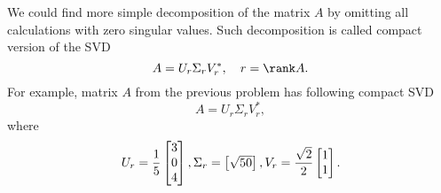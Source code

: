 \begin{note}
    We could find more simple decomposition of the matrix $A$ by omitting all calculations with zero singular values. Such decomposition is called compact version of the SVD
    $$
        A=U_{r}\Sigma_{r} V_{r}^*,\quad r=\rank A.
    $$
    For example, matrix $A$ from the previous problem has following compact SVD
    $$
        A=U_{r}\Sigma_{r} V_{r}^*,
    $$
    where
    \[
        U_{r} = \dfrac{1}{5}\begin{bmatrix}
            3 \\
            0 \\
            4  
        \end{bmatrix}
            , \vspace*{0.5cm} \Sigma_{r} = 
        \begin{bmatrix}
            \sqrt{50}
        \end{bmatrix}
            , \vspace*{0.5cm} V_{r} = \frac{\sqrt{2}}{2} 
        \begin{bmatrix}
            1 \\
            1 
        \end{bmatrix}.
    \]
\end{note}
